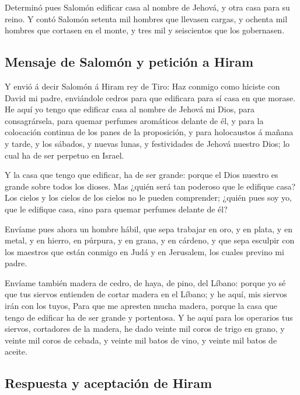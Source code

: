  Determinó pues Salomón edificar casa al nombre de Jehová,
y otra casa para su reino.  Y contó Salomón setenta mil
hombres que llevasen cargas, y ochenta mil hombres que cortasen en el
monte, y tres mil y seiscientos que los gobernasen.

\hypertarget{mensaje-de-salomuxf3n-y-peticiuxf3n-a-hiram}{%
\subsection{Mensaje de Salomón y petición a
Hiram}\label{mensaje-de-salomuxf3n-y-peticiuxf3n-a-hiram}}

 Y envió á decir Salomón á Hiram rey de Tiro: Haz conmigo
como hiciste con David mi padre, enviándole cedros para que edificara
para sí casa en que morase.  He aquí yo tengo que edificar
casa al nombre de Jehová mi Dios, para consagrársela, para quemar
perfumes aromáticos delante de él, y para la colocación continua de los
panes de la proposición, y para holocaustos á mañana y tarde, y los
sábados, y nuevas lunas, y festividades de Jehová nuestro Dios; lo cual
ha de ser perpetuo en Israel.

 Y la casa que tengo que edificar, ha de ser grande:
porque el Dios nuestro es grande sobre todos los dioses. 
Mas ¿quién será tan poderoso que le edifique casa? Los cielos y los
cielos de los cielos no le pueden comprender; ¿quién pues soy yo, que le
edifique casa, sino para quemar perfumes delante de él?

 Envíame pues ahora un hombre hábil, que sepa trabajar en
oro, y en plata, y en metal, y en hierro, en púrpura, y en grana, y en
cárdeno, y que sepa esculpir con los maestros que están conmigo en Judá
y en Jerusalem, los cuales previno mi padre.

 Envíame también madera de cedro, de haya, de pino, del
Líbano: porque yo sé que tus siervos entienden de cortar madera en el
Líbano; y he aquí, mis siervos irán con los tuyos,  Para
que me apresten mucha madera, porque la casa que tengo de edificar ha de
ser grande y portentosa.  Y he aquí para los operarios
tus siervos, cortadores de la madera, he dado veinte mil coros de trigo
en grano, y veinte mil coros de cebada, y veinte mil batos de vino, y
veinte mil batos de aceite.

\hypertarget{respuesta-y-aceptaciuxf3n-de-hiram}{%
\subsection{Respuesta y aceptación de
Hiram}\label{respuesta-y-aceptaciuxf3n-de-hiram}}

